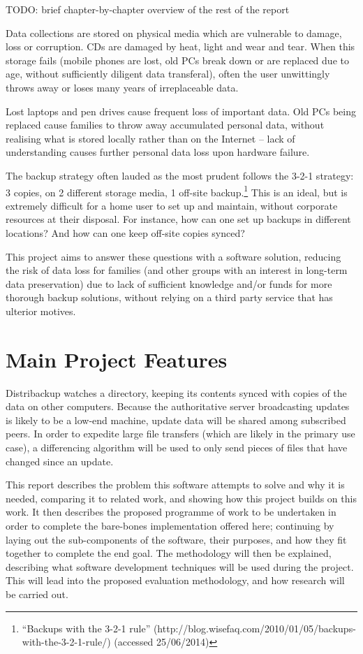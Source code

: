\documentclass[12pt,a4paper,]{adreport}
\begin{document}
TODO: brief chapter-by-chapter overview of the rest of the report

Data collections are stored on physical media which are vulnerable to
damage, loss or corruption. CDs are damaged by heat, light and wear and
tear. When this storage fails (mobile phones are lost, old PCs break
down or are replaced due to age, without sufficiently diligent data
transferal), often the user unwittingly throws away or loses many years
of irreplaceable data.

Lost laptops and pen drives cause frequent loss of important data. Old
PCs being replaced cause families to throw away accumulated personal
data, without realising what is stored locally rather than on the
Internet -- lack of understanding causes further personal data loss upon
hardware failure.

The backup strategy often lauded as the most prudent follows the 3-2-1
strategy: 3 copies, on 2 different storage media, 1 off-site
backup.\footnote{``Backups with the 3-2-1 rule''
  (http://blog.wisefaq.com/2010/01/05/backups-with-the-3-2-1-rule/)
  (accessed 25/06/2014)} This is an ideal, but is extremely difficult
for a home user to set up and maintain, without corporate resources at
their disposal. For instance, how can one set up backups in different
locations? And how can one keep off-site copies synced?

This project aims to answer these questions with a software solution,
reducing the risk of data loss for families (and other groups with an
interest in long-term data preservation) due to lack of sufficient
knowledge and/or funds for more thorough backup solutions, without
relying on a third party service that has ulterior motives.

\section{Main Project Features}\label{main-project-features}

Distribackup watches a directory, keeping its contents synced with
copies of the data on other computers. Because the authoritative server
broadcasting updates is likely to be a low-end machine, update data will
be shared among subscribed peers. In order to expedite large file
transfers (which are likely in the primary use case), a differencing
algorithm will be used to only send pieces of files that have changed
since an update.

This report describes the problem this software attempts to solve and
why it is needed, comparing it to related work, and showing how this
project builds on this work. It then describes the proposed programme of
work to be undertaken in order to complete the bare-bones implementation
offered here; continuing by laying out the sub-components of the
software, their purposes, and how they fit together to complete the end
goal. The methodology will then be explained, describing what software
development techniques will be used during the project. This will lead
into the proposed evaluation methodology, and how research will be
carried out.
\end{document}
